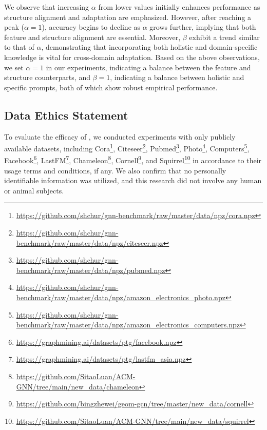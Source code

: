 We observe that increasing $\alpha$ from lower values initially enhances performance as structure alignment and adaptation are emphasized. However, after reaching a peak ($\alpha=1$), accuracy begins to decline as $\alpha$ grows further, implying that both feature and structure alignment are essential. 
Moreover, $\beta$ exhibit a trend similar to that of $\alpha$, demonstrating that incorporating both holistic and domain-specific knowledge is vital for cross-domain adaptation.
Based on the above observations, we set $\alpha=1$ in our experiments, indicating a balance between the feature and structure counterparts, and $\beta=1$, indicating a balance between holistic and specific prompts, both of which show robust empirical performance.


\subsection{Data Ethics Statement}
To evaluate the efficacy of \model, we conducted experiments with only publicly available
datasets, including Cora\footnote{\url{https://github.com/shchur/gnn-benchmark/raw/master/data/npz/cora.npz}}, Citeseer\footnote{\url{https://github.com/shchur/gnn-benchmark/raw/master/data/npz/citeseer.npz}}, Pubmed\footnote{\url{https://github.com/shchur/gnn-benchmark/raw/master/data/npz/pubmed.npz}}, Photo\footnote{\url{https://github.com/shchur/gnn-benchmark/raw/master/data/npz/amazon_electronics_photo.npz}},  Computers\footnote{\url{https://github.com/shchur/gnn-benchmark/raw/master/data/npz/amazon_electronics_computers.npz}}, 
Facebook\footnote{\url{https://graphmining.ai/datasets/ptg/facebook.npz}},
LastFM\footnote{\url{https://graphmining.ai/datasets/ptg/lastfm_asia.npz}},
Chameleon\footnote{\url{https://github.com/SitaoLuan/ACM-GNN/tree/main/new_data/chameleon}},
Cornell\footnote{\url{https://github.com/bingzhewei/geom-gcn/tree/master/new_data/cornell}}, and
Squirrel\footnote{\url{https://github.com/SitaoLuan/ACM-GNN/tree/main/new_data/squirrel}}
in accordance to their usage terms and conditions, if any.
We also confirm that no personally identifiable information was utilized, and this research did not involve any human or animal subjects.

